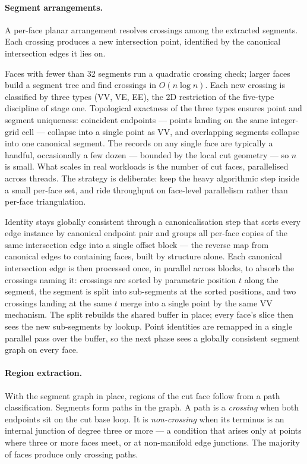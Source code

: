 \documentclass{egpubl}
\begin{document}
\paragraph{Segment arrangements.}
A per-face planar arrangement resolves crossings among the extracted segments. Each crossing produces a new intersection point, identified by the canonical intersection edges it lies on.

Faces with fewer than 32 segments run a quadratic crossing check; larger faces build a segment tree and find crossings in $O(n \log n)$. Each new crossing is classified by three types (VV, VE, EE), the 2D restriction of the five-type discipline of stage one. Topological exactness of the three types ensures point and segment uniqueness: coincident endpoints --- points landing on the same integer-grid cell --- collapse into a single point as VV, and overlapping segments collapse into one canonical segment. The records on any single face are typically a handful, occasionally a few dozen --- bounded by the local cut geometry --- so $n$ is small. What scales in real workloads is the number of cut faces, parallelised across threads. The strategy is deliberate: keep the heavy algorithmic step inside a small per-face set, and ride throughput on face-level parallelism rather than per-face triangulation.

Identity stays globally consistent through a canonicalisation step that sorts every edge instance by canonical endpoint pair and groups all per-face copies of the same intersection edge into a single offset block --- the reverse map from canonical edges to containing faces, built by structure alone. Each canonical intersection edge is then processed once, in parallel across blocks, to absorb the crossings naming it: crossings are sorted by parametric position $t$ along the segment, the segment is split into sub-segments at the sorted positions, and two crossings landing at the same $t$ merge into a single point by the same VV mechanism. The split rebuilds the shared buffer in place; every face's slice then sees the new sub-segments by lookup. Point identities are remapped in a single parallel pass over the buffer, so the next phase sees a globally consistent segment graph on every face.

\paragraph{Region extraction.}
With the segment graph in place, regions of the cut face follow from a path classification. Segments form paths in the graph. A path is a \emph{crossing} when both endpoints sit on the cut base loop. It is \emph{non-crossing} when its terminus is an internal junction of degree three or more --- a condition that arises only at points where three or more faces meet, or at non-manifold edge junctions. The majority of faces produce only crossing paths.
\end{document}
